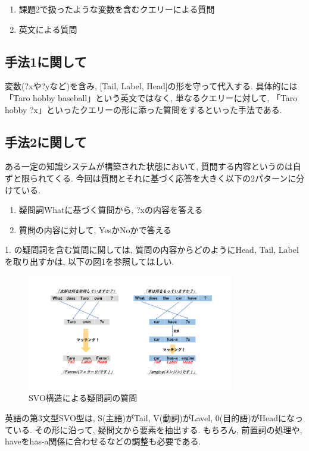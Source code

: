 \documentclass[uplatex,12pt]{jsarticle}
\begin{document}
\begin{enumerate}
\item 課題2で扱ったような変数を含むクエリーによる質問
\item 英文による質問
\end{enumerate}

\subsection{手法1に関して}
変数(?xや?yなど)を含み, [Tail, Label, Head]の形を守って代入する. 具体的には「Taro hobby baseball」という英文ではなく, 単なるクエリーに対して, 「Taro hobby ?x」といったクエリーの形に添った質問をするといった手法である.

\subsection{手法2に関して}
ある一定の知識システムが構築された状態において, 質問する内容というのは自ずと限られてくる. 今回は質問とそれに基づく応答を大きく以下の2パターンに分けている. 

\begin{enumerate}
\item 疑問詞Whatに基づく質問から,  ?xの内容を答える
\item 質問の内容に対して, YesかNoかで答える
\end{enumerate}

1. の疑問詞を含む質問に関しては, 質問の内容からどのようにHead, Tail, Labelを取り出すかは, 以下の図1を参照してほしい.
\begin{figure}[htbp]
 \begin{center}
  \includegraphics[width = 9cm, pagebox = cropbox, clip]{英文構造_疑問詞SVO.pdf}
 \end{center}
 \caption[]{SVO構造による疑問詞の質問}\label{fig:fig1.1}
\end{figure}

英語の第3文型SVO型は, S(主語)がTail, V(動詞)がLavel, 0(目的語)がHeadになっている. その形に沿って, 疑問文から要素を抽出する. もちろん, 前置詞の処理や, haveをhas-a関係に合わせるなどの調整も必要である.
\end{document}
